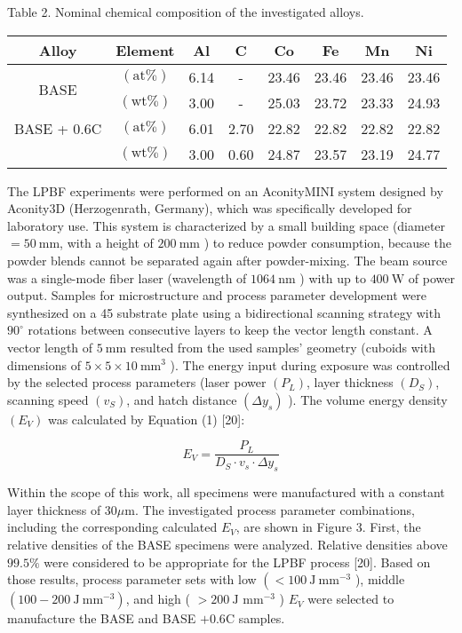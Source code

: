 \documentclass[10pt]{article}
\begin{document}
Table 2. Nominal chemical composition of the investigated alloys.

\begin{center}
\begin{tabular}{cccccccc}
\hline
Alloy & Element & Al & C & Co & Fe & Mn & Ni \\
\hline
\multirow{2}{*}{BASE} & $(\mathrm{at} \%)$ & 6.14 & - & 23.46 & 23.46 & 23.46 & 23.46 \\
 & $(\mathrm{wt} \%)$ & 3.00 & - & 25.03 & 23.72 & 23.33 & 24.93 \\
BASE + 0.6C & $(\mathrm{at} \%)$ & 6.01 & 2.70 & 22.82 & 22.82 & 22.82 & 22.82 \\
 & $(\mathrm{wt} \%)$ & 3.00 & 0.60 & 24.87 & 23.57 & 23.19 & 24.77 \\
\hline
\end{tabular}
\end{center}

The LPBF experiments were performed on an AconityMINI system designed by Aconity3D (Herzogenrath, Germany), which was specifically developed for laboratory use. This system is characterized by a small building space (diameter $=50 \mathrm{~mm}$, with a height of $200 \mathrm{~mm}$ ) to reduce powder consumption, because the powder blends cannot be separated again after powder-mixing. The beam source was a single-mode fiber laser (wavelength of $1064 \mathrm{~nm}$ ) with up to $400 \mathrm{~W}$ of power output. Samples for microstructure and process parameter development were synthesized on a 45 substrate plate using a bidirectional scanning strategy with $90^{\circ}$ rotations between consecutive layers to keep the vector length constant. A vector length of $5 \mathrm{~mm}$ resulted from the used samples' geometry (cuboids with dimensions of $5 \times 5 \times 10 \mathrm{~mm}^{3}$ ). The energy input during exposure was controlled by the selected process parameters (laser power $\left(P_{L}\right)$, layer thickness $\left(D_{S}\right)$, scanning speed $\left(v_{S}\right)$, and hatch distance $\left(\Delta y_{s}\right)$ ). The volume energy density $\left(E_{V}\right)$ was calculated by Equation (1) [20]:


\begin{equation*}
E_{V}=\frac{P_{L}}{D_{S} \cdot v_{s} \cdot \Delta y_{s}} \tag{1}
\end{equation*}


Within the scope of this work, all specimens were manufactured with a constant layer thickness of $30 \mu \mathrm{m}$. The investigated process parameter combinations, including the corresponding calculated $E_{V}$, are shown in Figure 3. First, the relative densities of the BASE specimens were analyzed. Relative densities above $99.5 \%$ were considered to be appropriate for the LPBF process [20]. Based on those results, process parameter sets with low $\left(<100 \mathrm{~J} \mathrm{~mm}^{-3}\right.$ ), middle $\left(100-200 \mathrm{~J} \mathrm{~mm}^{-3}\right)$, and high ( $>200 \mathrm{~J}$ $\mathrm{mm}^{-3}$ ) $E_{V}$ were selected to manufacture the BASE and BASE $+0.6 \mathrm{C}$ samples.
\end{document}
